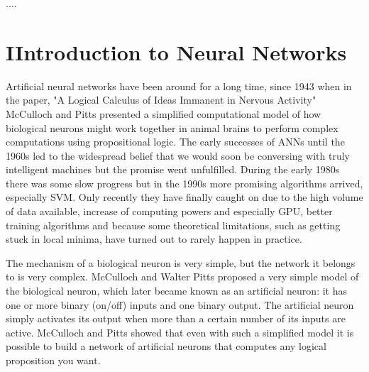 \documentclass[12pt, letterpaper]{article}
\theoremstyle{definition}
\begin{document}
....
\newpage
\section{IIntroduction to Neural Networks}
\newcommand{\derl}{\mathrm{\delta^\ell}}
\newcommand{\derL}{\mathrm{\delta^L}}
\newcommand{\derlj}{\mathrm{\delta^\ell_j}} 
\newcommand{\derLj}{\mathrm{\delta^L_j}} 
\newcommand{\derLn}{\mathrm{\delta^{L+1}}}
\newcommand{\derln}{\mathrm{\delta^{l+1}}}
\newcommand{\derLkn}{\mathrm{\delta_k^{L+1}}} 
\newcommand{\derlkn}{\mathrm{\delta_k^{l+1}}} 
\newcommand{\derCL}{\mathrm{\frac{\partial C}{\partial a_j^L}}}
\newcommand{\derCl}{\mathrm{\frac{\partial C}{\partial a_j^\ell}}}

Artificial neural networks have been around for a long time, since 1943 when in the paper, "A Logical Calculus of Ideas Immanent in Nervous Activity" McCulloch and Pitts presented a simplified computational model of how biological neurons might work together in animal brains to perform complex computations using propositional logic. The early successes of ANNs until the 1960s led to the widespread belief that we would soon be conversing with truly intelligent machines but the promise went unfulfilled. During the early 1980s there was some slow progress but in the 1990s more promising algorithms arrived, especially SVM. Only recently they have finally caught on due to the high volume of data available, increase of computing powers and especially GPU, better training algorithms and because some theoretical limitations, such as getting stuck in local minima, have turned out to rarely happen in practice.

The mechanism of a biological neuron is very simple, but the network it belongs to is very complex. McCulloch and Walter Pitts proposed a very simple model of the biological neuron, which later became known as an artificial neuron: it has one or more binary (on/off) inputs and one binary output. The artificial neuron simply activates its output when more than a certain number of its inputs are active. McCulloch and Pitts showed that even with such a simplified model it is possible to build a network of artificial neurons that computes any logical proposition you want.
\end{document}
